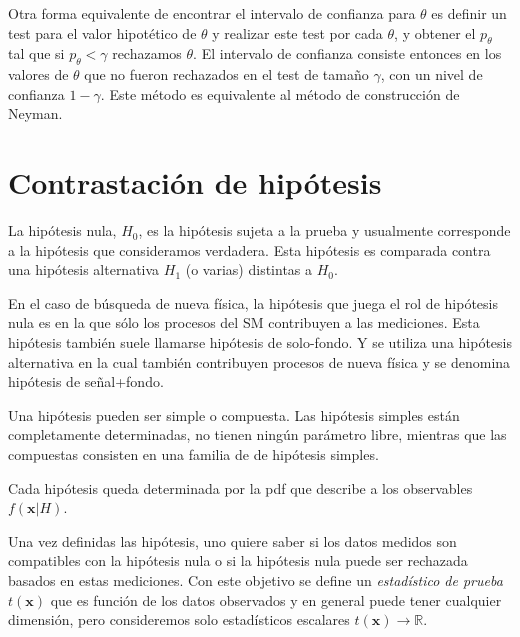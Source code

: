 
Otra forma equivalente de encontrar el intervalo de confianza para $\theta$ es
definir un test para el valor hipotético de $\theta$ y realizar este test por
cada $\theta$, y obtener el {\pvalue} $p_\theta$ tal que si $p_\theta < \gamma$
rechazamos $\theta$. El intervalo de confianza consiste entonces en los valores
de $\theta$ que no fueron rechazados en el test de tamaño $\gamma$, con un nivel
de confianza $1-\gamma$. Este método es equivalente al método de construcción de
Neyman.


\section{Contrastación de hipótesis} %

La hipótesis nula, $H_0$, es la hipótesis sujeta a la prueba y usualmente
corresponde a la hipótesis que consideramos verdadera. Esta hipótesis es
comparada contra una hipótesis alternativa $H_1$ (o varias) distintas a $H_0$.

En el caso de búsqueda de nueva física, la hipótesis que juega el rol de
hipótesis nula es en la que sólo los procesos del SM contribuyen a las
mediciones. Esta hipótesis también suele llamarse hipótesis de solo-fondo. Y se
utiliza una hipótesis alternativa en la cual también contribuyen procesos de
nueva física y se denomina hipótesis de se\~nal+fondo.

Una hipótesis pueden ser simple o compuesta. Las hipótesis simples están
completamente determinadas, no tienen ningún parámetro libre, mientras que las
compuestas consisten en una familia de de hipótesis simples.

Cada hipótesis queda determinada por la pdf que describe a los observables
$f(\bm{x}|H)$.

Una vez definidas las hipótesis, uno quiere saber si los datos medidos son
compatibles con la hipótesis nula o si la hipótesis nula puede ser rechazada
basados en estas mediciones. Con este objetivo se define un \emph{estadístico de
  prueba} $t(\bm{x})$ que es función de los datos observados y en general puede
tener cualquier dimensión, pero consideremos solo estadísticos escalares
$t(\bm{x}) \to \mathbb{R}$.

